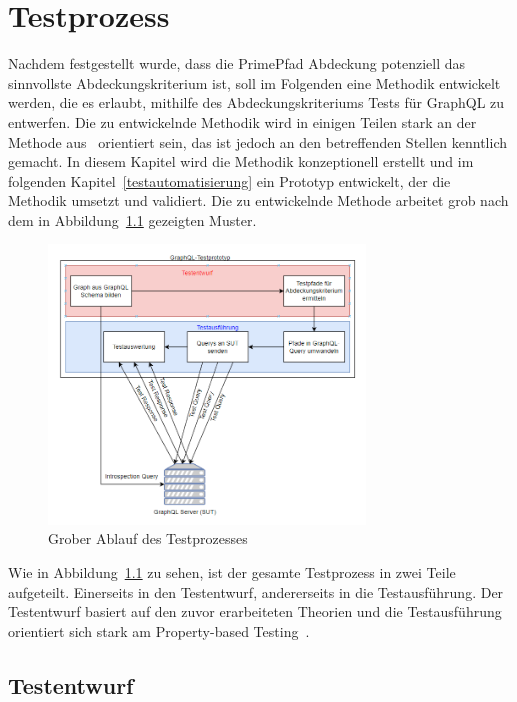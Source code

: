 \chapter{Testprozess}
\label{testentwurf}

Nachdem festgestellt wurde, dass die PrimePfad Abdeckung potenziell das sinnvollste Abdeckungskriterium ist, soll im Folgenden eine
Methodik entwickelt werden, die es erlaubt, mithilfe des Abdeckungskriteriums Tests für GraphQL zu entwerfen.
Die zu entwickelnde Methodik wird in einigen Teilen stark an der Methode aus~\cite{property-based-testing} orientiert sein, das ist jedoch an den betreffenden Stellen kenntlich gemacht.
In diesem Kapitel wird die Methodik konzeptionell erstellt und im folgenden Kapitel~\ref{testautomatisierung} ein Prototyp entwickelt, der
die Methodik umsetzt und validiert.
Die zu entwickelnde Methode arbeitet grob nach dem in Abbildung~\ref{methodeablauf} gezeigten Muster.

\begin{figure}[H]
    \centering
    \includegraphics[width=0.75\textwidth,keepaspectratio]{img/fktweiseprototyp}
    \caption{Grober Ablauf des Testprozesses}
    \label{methodeablauf}
\end{figure}

Wie in Abbildung~\ref{methodeablauf} zu sehen, ist der gesamte Testprozess in zwei Teile aufgeteilt.
Einerseits in den Testentwurf, andererseits in die Testausführung.
Der Testentwurf basiert auf den zuvor erarbeiteten Theorien und die Testausführung orientiert sich stark am
Property-based Testing~\cite[vgl. Method]{property-based-testing}.

\section{Testentwurf}

